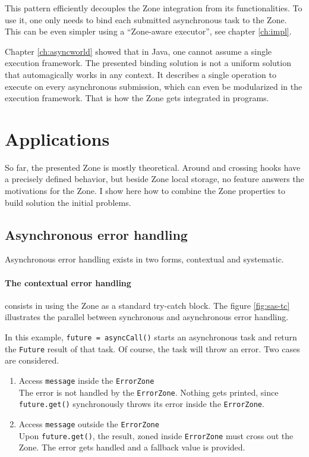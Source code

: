 This pattern efficiently decouples the Zone integration from its functionalities. To use it, one only needs to bind each submitted asynchronous task to the Zone. This can be even simpler using a ``Zone-aware executor'', see chapter \ref{ch:impl}.

Chapter \ref{ch:asyncworld} showed that in Java, one cannot assume a single execution framework. The presented binding solution is not a uniform solution that automagically works in any context. It describes a single operation to execute on every asynchronous submission, which can even be modularized in the execution framework. That is how the Zone gets integrated in programs.


\section{Applications} %

So far, the presented Zone is mostly theoretical. Around and crossing hooks have a precisely defined behavior, but beside Zone local storage, no feature answers the motivations for the Zone. I show here how to combine the Zone properties to build solution the initial problems.

\subsection*{Asynchronous error handling}

Asynchronous error handling exists in two forms, contextual and systematic.

\paragraph{The contextual error handling} consists in using the Zone as a standard try-catch block. The figure \ref{fig:sas-tc} illustrates the parallel between synchronous and asynchronous error handling.

In this example, \lstinline{future = asyncCall()} starts an asynchronous task and return the \lstinline{Future} result of that task. Of course, the task will throw an error. Two cases are considered.

\begin{enumerate}
\item Access \lstinline{message} inside the \lstinline{ErrorZone}\\
The error is not handled by the \lstinline{ErrorZone}. Nothing gets printed, since \lstinline{future.get()} synchronously throws its error inside the \lstinline{ErrorZone}.
\item Access \lstinline{message} outside the \lstinline{ErrorZone}\\
Upon \lstinline{future.get()}, the result, zoned inside \lstinline{ErrorZone} must cross out the Zone. The error gets handled and a fallback value is provided.
\end{enumerate}

